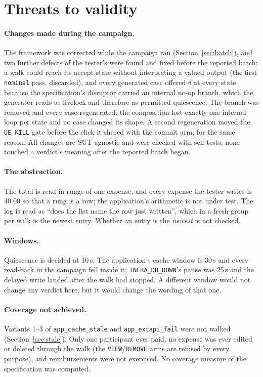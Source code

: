\documentclass[11pt,a4paper]{article}
\newcommand{\gate}[1]{\texttt{\small #1}}
\begin{document}
\section{Threats to validity}
\label{sec:threats}

\paragraph{Changes made during the campaign.}
The framework was corrected while the campaign ran (Section~\ref{sec:batch}),
and two further defects of the tester's were found and fixed before the reported
batch: a walk could reach its accept state without interpreting a valued output
(the first \gate{nominal} pass, discarded), and every generated case offered
$\delta$ at every state because the specification's disruptor carried an
internal no-op branch, which the generator reads as livelock and therefore as
permitted quiescence. The branch was removed and every case regenerated: the
composition lost exactly one internal loop per state and no case changed its
shape. A second regeneration moved the \gate{UE\_KILL} gate before the click it
shared with the commit arm, for the same reason. All changes are SUT-agnostic
and were checked with self-tests; none touched a verdict's meaning after the
reported batch began.

\paragraph{The abstraction.}
The total is read in rungs of one expense, and every expense the tester writes
is 40.00 so that a rung is a row; the application's arithmetic is not under
test. The log is read as ``does the list name the row just written'', which in
a fresh group per walk is the newest entry. Whether an entry is the
\emph{newest} is not checked.

\paragraph{Windows.}
Quiescence is decided at 10\,s. The application's cache window is 30\,s and
every read-back in the campaign fell inside it; \gate{INFRA\_DB\_DOWN}'s pause
was 25\,s and the delayed write landed after the walk had stopped. A different
window would not change any verdict here, but it would change the wording of
that one.

\paragraph{Coverage not achieved.}
Variants 1--3 of \gate{app\_cache\_stale} and \gate{app\_extapi\_fail} were not
walked (Section~\ref{sec:stale}). Only one participant ever paid, no expense was
ever edited or deleted through the walk (the \gate{VIEW}/\gate{REMOVE} arms are
refused by every purpose), and reimbursements were not exercised. No
coverage measure of the specification was computed.
\end{document}
